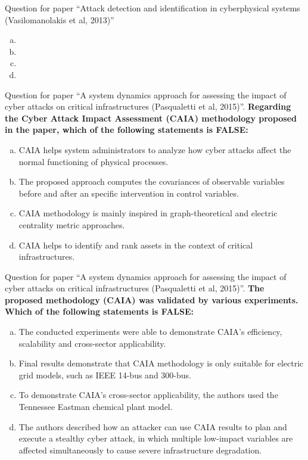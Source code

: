 \documentclass[compress]{beamer}
\begin{document}
\begin{frame}{Question for paper ``Attack detection and identification in cyberphysical systems (Vasilomanolakis et al, 2013)''}
      \textbf{}
      \begin{enumerate}[(a)]
       \item 
       \item 
       \item 
       \item 
      \end{enumerate}
\end{frame}

\begin{frame}{Question for paper ``A system dynamics approach for assessing the impact of cyber attacks on critical infrastructures (Pasqualetti et al, 2015)''.}
      \textbf{Regarding the Cyber Attack Impact Assessment (CAIA) methodology proposed in the paper, which of the following statements is FALSE:}
      \begin{enumerate}[(a)]
       \item CAIA helps system administrators to analyze how cyber attacks affect the normal functioning of physical processes.
       \item The proposed approach computes the covariances of observable variables before and after an specific intervention in control variables.
       \item CAIA methodology is mainly inspired in graph-theoretical and electric centrality metric approaches.
       \item CAIA helps to identify and rank assets in the context of critical infrastructures.
      \end{enumerate}
\end{frame}

\begin{frame}{Question for paper ``A system dynamics approach for assessing the impact of cyber attacks on critical infrastructures (Pasqualetti et al, 2015)''.}
      \textbf{The proposed methodology (CAIA) was validated by various experiments. Which of the following statements is FALSE:}
      \begin{enumerate}[(a)]
       \item The conducted experiments were able to demonstrate CAIA's efficiency, scalability and cross-sector applicability.
       \item Final results demonstrate that CAIA methodology is only suitable for electric grid models, such as IEEE 14-bus and 300-bus.
       \item To demonstrate CAIA's cross-sector applicability, the authors used the Tennessee Eastman chemical plant model.
       \item The authors described how an attacker can use CAIA results to plan and execute a stealthy cyber attack, in which multiple low-impact variables are affected simultaneously to cause severe infrastructure degradation.
      \end{enumerate}
\end{frame}
\end{document}
